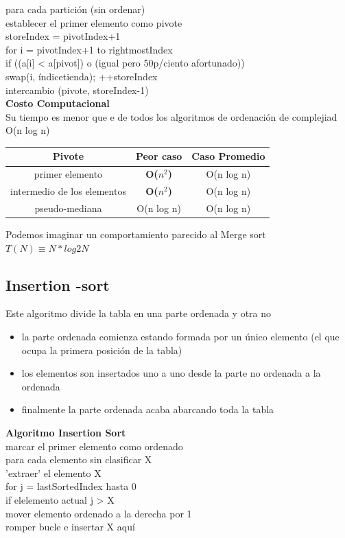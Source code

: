 \documentclass{article}
\begin{document}
\tab para cada partición (sin ordenar)\\
\tab establecer el primer elemento como pivote\\
\tab\tab   storeIndex = pivotIndex+1\\
\tab\tab   for i = pivotIndex+1 to rightmostIndex\\
\tab\tab\tab     if ((a[i] < a[pivot]) o (igual pero 50p/ciento afortunado))\\
\tab\tab       swap(i, índicetienda); ++storeIndex\\
\tab   intercambio (pivote, storeIndex-1)\\
\textbf{Costo Computacional}\\
Su tiempo es menor que e de todos los algoritmos de ordenación de complejiad O(n log n)
\begin{center}
   \begin{tabular}{|c|c|c|}
\hline 
\textbf{Pivote} & \textbf{Peor caso} & \textbf{Caso Promedio}\tabularnewline
\hline 
primer elemento & \textbf{O($n^2$)} & O(n log n)\tabularnewline\hline 
intermedio de los elementos & \textbf{O($n^2$)} & O(n log n)\tabularnewline\hline 
pseudo-mediana & O(n log n) & O(n log n)\tabularnewline\hline 
\end{tabular} 
\end{center}
Podemos imaginar un comportamiento parecido al Merge sort\\
$T(N) \equiv N * log2 N$

\subsection{Insertion -sort}
Este algoritmo divide la tabla en una parte ordenada y otra no
\begin{itemize}
    \item la parte ordenada comienza estando formada por un único elemento (el que ocupa la primera posición de la tabla)
    \item los elementos son insertados uno a uno desde la parte no ordenada a la ordenada
    \item finalmente la parte ordenada acaba abarcando toda la tabla
\end{itemize}
\textbf{Algoritmo Insertion Sort}\\
\tab marcar el primer elemento como ordenado\\
\tab para cada elemento sin clasificar X\\
\tab \tab    'extraer' el elemento X\\
\tab \tab    for j = lastSortedIndex hasta 0\\
\tab \tab \tab      if elelemento actual j > X\\
\tab \tab \tab        mover elemento ordenado a la derecha por 1\\
\tab \tab      romper bucle e insertar X aquí\\
\end{document}
